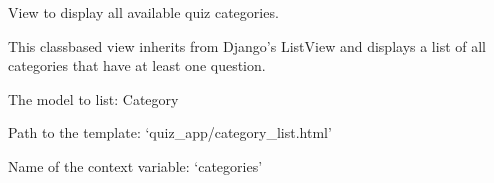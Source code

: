 \documentclass[letterpaper,10pt,english]{sphinxmanual}
\begin{document}
\begin{fulllineitems}
\label{\detokenize{views:CategoryListView}}
\pysigstartsignatures
\pysigline
{}
\pysigstopsignatures
\sphinxAtStartPar
View to display all available quiz categories.

\sphinxAtStartPar
This class\sphinxhyphen{}based view inherits from Django’s ListView and displays
a list of all categories that have at least one question.

\begin{fulllineitems}
\label{\detokenize{views:CategoryListView.model}}
\pysigstartsignatures
\pysigline
{}
\pysigstopsignatures
\sphinxAtStartPar
The model to list: Category

\end{fulllineitems}


\begin{fulllineitems}
\label{\detokenize{views:CategoryListView.template_name}}
\pysigstartsignatures
\pysigline
{}
\pysigstopsignatures
\sphinxAtStartPar
Path to the template: ‘quiz\_app/category\_list.html’

\end{fulllineitems}


\begin{fulllineitems}
\label{\detokenize{views:CategoryListView.context_object_name}}
\pysigstartsignatures
\pysigline
{}
\pysigstopsignatures
\sphinxAtStartPar
Name of the context variable: ‘categories’

\end{fulllineitems}


\end{fulllineitems}
\end{document}
